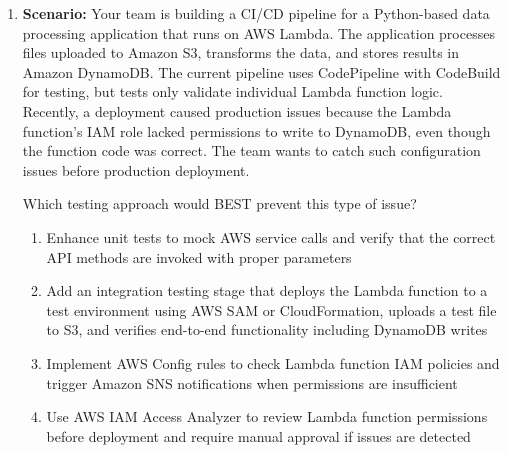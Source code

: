 \documentclass[12pt,a4paper]{article}
\begin{document}
\begin{enumerate}[label=\textbf{Q\arabic*.}]
What approach would BEST improve test reliability?

\begin{enumerate}[label=\Alph*.]
    \item Increase the timeout to 30 seconds for all integration tests to accommodate slow external service responses
    \item Implement retry logic in the test code with exponential backoff for external service calls, and configure tests to fail only after 3 consecutive failures
    \item Remove integration tests that depend on external services from the pipeline and run them separately on a scheduled basis
    \item Mock all external service calls in the integration tests to eliminate dependency on third-party API response times
\end{enumerate}

\textit{Answer: B}

\item \textbf{Scenario:} Your team is building a CI/CD pipeline for a Python-based data processing application that runs on AWS Lambda. The application processes files uploaded to Amazon S3, transforms the data, and stores results in Amazon DynamoDB. The current pipeline uses CodePipeline with CodeBuild for testing, but tests only validate individual Lambda function logic. Recently, a deployment caused production issues because the Lambda function's IAM role lacked permissions to write to DynamoDB, even though the function code was correct. The team wants to catch such configuration issues before production deployment.

Which testing approach would BEST prevent this type of issue?

\begin{enumerate}[label=\Alph*.]
    \item Enhance unit tests to mock AWS service calls and verify that the correct API methods are invoked with proper parameters
    \item Add an integration testing stage that deploys the Lambda function to a test environment using AWS SAM or CloudFormation, uploads a test file to S3, and verifies end-to-end functionality including DynamoDB writes
    \item Implement AWS Config rules to check Lambda function IAM policies and trigger Amazon SNS notifications when permissions are insufficient
    \item Use AWS IAM Access Analyzer to review Lambda function permissions before deployment and require manual approval if issues are detected
\end{enumerate}


\end{enumerate}
\end{document}
